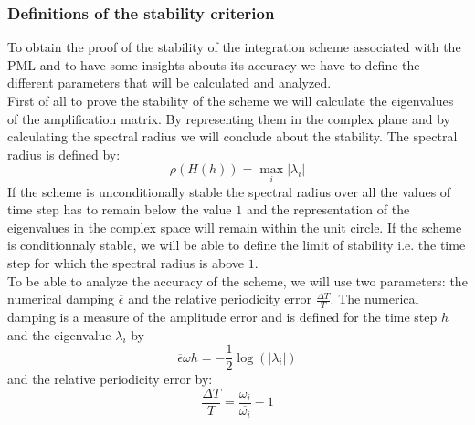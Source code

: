 \subsubsection{Definitions of the stability criterion}
To obtain the proof of the stability of the integration scheme associated with the PML and to have some insights abouts its accuracy we have to define the different parameters that will be calculated and analyzed. \\
First of all to prove the stability of the scheme we will calculate the eigenvalues of the amplification matrix. By representing them in the complex plane and by calculating the spectral radius we will conclude about the stability. The spectral radius is defined by:
\begin{equation}
\rho(H(h)) = \max_i |\lambda_i| 
\end{equation}
If the scheme is unconditionally stable the spectral radius over all the values of time step has to remain below the value $1$ and the representation of the eigenvalues in the complex space will remain within the unit circle. If the scheme is conditionnaly stable, we will be able to define the limit of stability i.e. the time step for which the spectral radius is above $1$.\\
To be able to analyze the accuracy of the scheme, we will use two parameters: the numerical damping $\overline{\epsilon}$ and the relative periodicity error $\frac{\Delta T}{T}$. The numerical damping is a measure of the amplitude error and is defined for the time step $h$ and the eigenvalue $\lambda_i$ by 
\begin{equation}
\overline{\epsilon} \omega h = -\frac{1}{2}\log(|\lambda_i|)
\end{equation}      
and the relative periodicity error by:
\begin{equation}
\frac{\Delta T}{T} = \frac{\omega_i}{\overline{\omega_i}} - 1
\end{equation}
